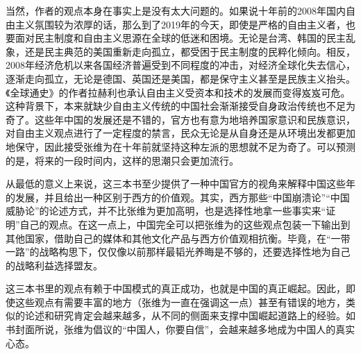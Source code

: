 当然，作者的观点本身在事实上是没有太大问题的。如果说十年前的2008年国内自由主义氛围较为浓厚的话，那么到了2019年的今天，即使是严格的自由主义者，也要面对民主制度和自由主义思源在全球的低迷和困境。无论是台湾、韩国的民主乱象，还是民主典范的美国重新走向孤立，都受困于民主制度的民粹化倾向。相反，2008年经济危机以来各国经济普遍受到不同程度的冲击，对经济全球化失去信心，逐渐走向孤立，无论是德国、英国还是美国，都是保守主义甚至是民族主义抬头。《全球通史》的作者拉赫利也承认自由主义受资本和技术的发展而变得岌岌可危。这种背景下，本来就缺少自由主义传统的中国社会渐渐接受自身政治传统也不足为奇了。这些年中国的发展还是不错的，官方也有意为地培养国家意识和民族意识，对自由主义观点进行了一定程度的禁言，民众无论是从自身还是从环境出发都更加地保守，因此接受张维为在十年前就坚持这种左派的思想就不足为奇了。可以预测的是，将来的一段时间内，这样的思潮只会更加流行。

从最低的意义上来说，这三本书至少提供了一种中国官方的视角来解释中国这些年的发展，并且给出一种区别于西方的价值观。其实，西方那些“中国崩溃论”“中国威胁论”的论述方式，并不比张维为更加高明，也是选择性地拿一些事实来“证明”自己的观点。在这一点上，中国完全可以把张维为的这些观点包装一下输出到其他国家，借助自己的媒体和其他文化产品与西方价值观相抗衡。毕竟，在“一带一路”的战略构思下，仅仅像以前那样最韬光养晦是不够的，还要选择性地为自己的战略利益选择盟友。

这三本书里的观点有赖于中国模式的真正成功，也就是中国的真正崛起。因此，即使这些观点有需要丰富的地方（张维为一直在强调这一点）甚至有错误的地方，类似的论述和研究肯定会越来越多，从不同的侧面来支撑中国崛起道路上的经验。如书封面所说，张维为倡议的“中国人，你要自信”，会越来越多地成为中国人的真实 心态。